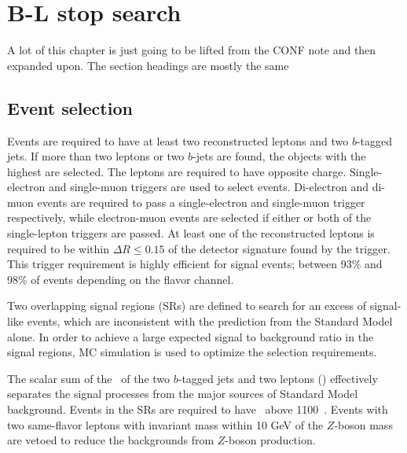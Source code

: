 \chapter[B-L stop search][B-L stop search]{B-L stop search}
\label{ch:bl_stop}

{\color{red}A lot of this chapter is just going to be lifted from the CONF note
  and then expanded upon. The section headings are mostly the same}

\section{Event selection}
\label{sec:event_selection}

Events are required to have at least two reconstructed leptons and two $b$-tagged
jets. If more than two leptons or two $b$-jets are found, the
objects with the highest \pt are selected. The leptons
are required to have opposite charge.
Single-electron and single-muon triggers are used to select events. 
Di-electron and di-muon events are required to pass a single-electron and
single-muon trigger respectively, while electron-muon events are selected if
either or both of the single-lepton triggers are passed.
At least one of the reconstructed leptons is required to be
within $\Delta R \leq 0.15$ of the detector signature found by the trigger.
This trigger requirement is highly efficient for signal events; between 93\%
and 98\% of events depending on the flavor channel.

Two overlapping signal regions (SRs) are defined to search for an excess of
signal-like events, which are inconsistent with the prediction from the
Standard Model alone.
In order to achieve a large expected signal to background ratio in the signal
regions, MC simulation is used to optimize the selection requirements.

The scalar sum of the \pt\ of the two $b$-tagged jets and two leptons (\HT) 
effectively separates the signal processes from the major sources of
Standard Model background.
Events in the SRs are required to have \HT\ above 1100~\GeV.
Events with two same-flavor leptons with invariant mass within 10 GeV of the
$Z$-boson mass are vetoed to reduce the backgrounds from $Z$-boson production.

